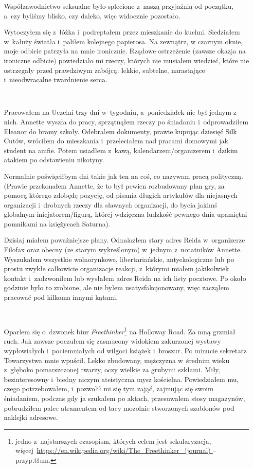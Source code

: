 \documentclass[oneside,polish,11pt,sfheadings]{mwbk}
\begin{document}
Współzawodnictwo seksualne było splecione z~naszą przyjaźnią od
początku, a~czy byliśmy blisko, czy daleko, więc widocznie pozostało.

Wytoczyłem się z~łóżka i~podreptałem przez mieszkanie do kuchni.
Siedziałem w~kałuży światła i~paliłem kolejnego papierosa. Na zewnątrz,
w czarnym oknie, moje odbicie patrzyła na mnie ironicznie. Rządowe
ostrzeżenie (zawsze okazja na ironiczne odbicie) powiedziało mi rzeczy,
których nie musiałem wiedzieć, które nie ostrzegały przed prawdziwym
zabójcą: lekkie, subtelne, narastające i~nieodwracalne twardnienie
serca.

~

Pracowałem na Uczelni trzy dni w~tygodniu, a~poniedziałek nie był jednym
z nich. Annette wyszła do pracy, sprzątnąłem rzeczy po śniadaniu i~odprowadziłem Eleanor do bramy szkoły. Odebrałem dokumenty, prawie
kupując dziesięć Silk Cutów, wróciłem do mieszkania i~przeleciałem nad
pracami domowymi jak student na amfie. Potem usiadłem z~kawą,
kalendarzem/organizerem i~dzikim atakiem po odstawieniu nikotyny.

Normalnie poświęciłbym dni takie jak ten na coś, co nazywam pracą
polityczną. (Prawie przekonałem Annette, że to był pewien rozbudowany
plan gry, za pomocą którego zdobędę pozycję, od pisania długich
artykułów dla niejasnych organizacji i~drobnych rzeczy dla sławnych
organizacji, do bycia jakimś globalnym inicjatorem/figurą, której
wdzięczna ludzkość pewnego dnia upamiętni pomnikami na księżycach
Saturna).

Dzisiaj miałem poważniejsze plany. Odnalazłem stary adres Reida w~organizerze Filofax oraz obecny (ze starym wykreślonym) w~jednym z~notatników Annette. Wyszukałem wszystkie wolnorynkowe, libertariańskie,
antyekologiczne lub po prostu zwykłe całkowicie organizacje reakcji, z~którymi miałem jakikolwiek kontakt i~zadzwoniłem lub wysłałem adres
Reida na ich listy pocztowe. Po około godzinie było to zrobione, ale nie
byłem usatysfakcjonowany, więc zacząłem pracować pod kilkoma innymi
kątami.

~

Oparłem się o~dzwonek biur \emph{Freethinker}\footnote{jedno z~najstarszych czasopism, których celem jest sekularyzacja,
więcej~\url{https://en.wikipedia.org/wiki/The_Freethinker_(journal)
} -- przyp.tłum.} na Holloway Road. Za mną grzmiał ruch. Jak zawsze poczułem się zasmucony
widokiem zakurzonej wystawy wypłowiałych i~pociemniałych od wilgoci
książek i~broszur. Po minucie sekretarz Towarzystwa mnie wpuścił. Lekko
zbudowany, mężczyzna w~średnim wieku z~głęboko pomarszczonej twarzy,
oczy wielkie za grubymi szkłami. Miły, bezinteresowny i~biedny niczym
ateistyczna mysz kościelna. Powiedziałem mu, czego potrzebowałem, i~pozwolił mi się tym zająć, zajmując się swoim śniadaniem, podczas gdy ja
szukałem po aktach, przesuwałem stosy magazynów, pobrudziłem palce
atramentem od tacy mozolnie stworzonych szablonów pod naklejki adresowe.
\end{document}

